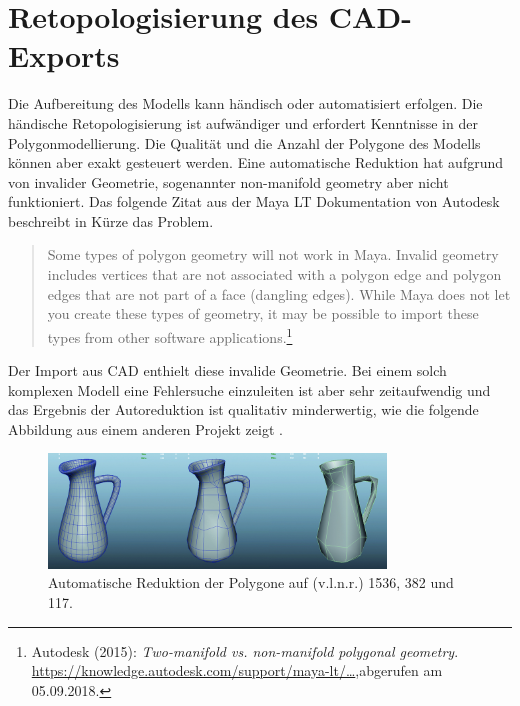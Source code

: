 \label{sec:RetopologisierungDesCAD-Exports}
\section{Retopologisierung des CAD-Exports}
Die Aufbereitung des Modells kann händisch oder automatisiert erfolgen. Die händische Retopologisierung ist aufwändiger und erfordert Kenntnisse in der Polygonmodellierung. Die Qualität und die Anzahl der Polygone des Modells können aber exakt gesteuert werden. Eine automatische Reduktion hat aufgrund von invalider Geometrie, sogenannter non-manifold geometry aber nicht funktioniert. Das folgende Zitat aus der Maya LT Dokumentation von Autodesk beschreibt in Kürze das Problem. 

\begin{quote}
\glqq Some types of polygon geometry will not work in Maya. Invalid geometry includes vertices that are not associated with a polygon edge and polygon edges that are not part of a face (dangling edges). While Maya does not let you create these types of geometry, it may be possible to import these types from other software applications.\grqq\footnote{Autodesk  (2015): \textit{Two-manifold vs. non-manifold polygonal geometry}.\newline
\href{https://knowledge.autodesk.com/support/maya-lt/learn-explore/caas/CloudHelp/cloudhelp/2015/ENU/MayaLT/files/Polygons-overview-Twomanifold-vs--nonmanifold-polygonal-geometry-htm.html}{https://knowledge.autodesk.com/support/maya-lt/\dots},\newline abgerufen am 05.09.2018.} 
\end{quote}

Der Import aus CAD enthielt diese invalide Geometrie. Bei einem solch komplexen Modell eine Fehlersuche einzuleiten ist aber sehr zeitaufwendig und das Ergebnis der Autoreduktion ist qualitativ minderwertig, wie die folgende Abbildung aus einem anderen Projekt zeigt . 

\begin{figure}[H]
	\centering
	\captionsetup{width=0.8\textwidth}
	\includegraphics[keepaspectratio, width=0.8\textwidth]{bildquellen/hp-zu-lp-automatisch}
	\caption{Automatische Reduktion der Polygone auf (v.l.n.r.) 1536, 382 und 117.}
	\label{fig:2.4}
\end{figure}

